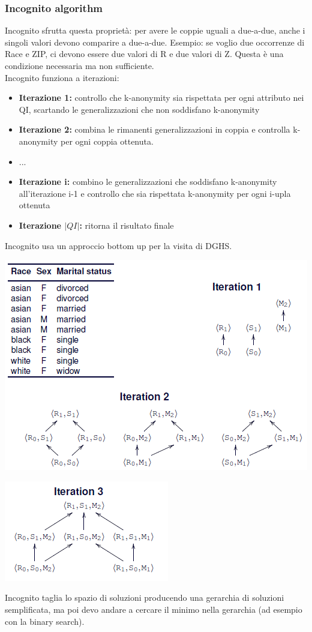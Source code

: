 \subsubsection{Incognito algorithm}
Incognito sfrutta questa proprietà: per avere le coppie uguali a due-a-due, anche i singoli valori devono comparire a due-a-due. Esempio: se voglio due occorrenze di Race e ZIP, ci devono essere due valori di R e due valori di Z. Questa è una condizione necessaria ma non sufficiente.\\
Incognito funziona a iterazioni:
\begin{itemize}
    \item \textbf{Iterazione 1:} controllo che k-anonymity sia rispettata per ogni attributo nei QI, scartando le generalizzazioni che non soddisfano k-anonymity
    \item \textbf{Iterazione 2:} combina le rimanenti generalizzazioni in coppia e controlla k-anonymity per ogni coppia ottenuta.
    \item ...
    \item \textbf{Iterazione i:} combino le generalizzazioni che soddisfano k-anonymity all'iterazione i-1 e controllo che sia rispettata k-anonymity per ogni i-upla ottenuta
    \item  \textbf{Iterazione \(|QI|\):} ritorna il risultato finale
\end{itemize}
Incognito usa un approccio bottom up per la visita di DGHS.
\begin{center}
    \includegraphics[scale=0.6]{img/inco1.png}
\end{center}
\begin{center}
    \includegraphics[scale=0.6]{img/inco2.png}
\end{center}
Incognito taglia lo spazio di soluzioni producendo una gerarchia di soluzioni semplificata, ma poi devo andare a cercare il minimo nella gerarchia (ad esempio con la binary search).

